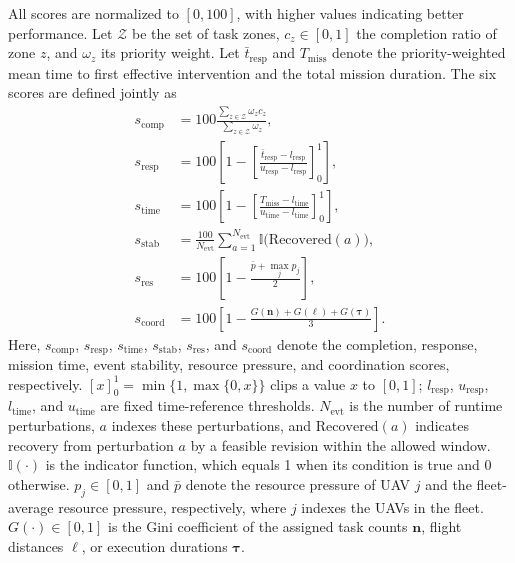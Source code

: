 All scores are normalized to $[0,100]$, with higher values indicating better
performance. Let $\mathcal{Z}$ be the set of task zones, $c_z\in[0,1]$ the completion
ratio of zone $z$, and $\omega_z$ its priority weight. Let
$\bar t_{\mathrm{resp}}$ and $T_{\mathrm{miss}}$ denote the priority-weighted mean time to
first effective intervention and the total mission duration. The six scores are
defined jointly as
\begin{equation}
\begin{aligned}
s_{\mathrm{comp}}
&=100\frac{\sum_{z\in \mathcal{Z}}\omega_zc_z}
 {\sum_{z\in \mathcal{Z}}\omega_z},\\
s_{\mathrm{resp}}
&=100\left[1-
\left[\frac{\bar t_{\mathrm{resp}}-l_{\mathrm{resp}}}
 {u_{\mathrm{resp}}-l_{\mathrm{resp}}}\right]_0^1\right],\\
s_{\mathrm{time}}
&=100\left[1-
\left[\frac{T_{\mathrm{miss}}-l_{\mathrm{time}}}
 {u_{\mathrm{time}}-l_{\mathrm{time}}}\right]_0^1\right],\\
s_{\mathrm{stab}}
&=\frac{100}{N_{\mathrm{evt}}}\sum_{a=1}^{N_{\mathrm{evt}}}
 \mathbb{I}\bigl(\mathrm{Recovered}(a)\bigr),\\
s_{\mathrm{res}}
 &=100\left[1-\frac{\bar p+\max_jp_j}{2}\right],\\
s_{\mathrm{coord}}
&=100\left[1-
\frac{G(\mathbf{n})+G(\boldsymbol{\ell})+G(\boldsymbol{\tau})}{3}\right].
\end{aligned}
\label{eq:mission-level-scores}
\end{equation}
Here, $s_{\mathrm{comp}}$, $s_{\mathrm{resp}}$, $s_{\mathrm{time}}$,
$s_{\mathrm{stab}}$, $s_{\mathrm{res}}$, and $s_{\mathrm{coord}}$ denote the
completion, response, mission time, event stability, resource pressure, and
coordination scores, respectively. $[x]_0^1=\min\{1,\max\{0,x\}\}$ clips a
value $x$ to $[0,1]$;
$l_{\mathrm{resp}}$, $u_{\mathrm{resp}}$, $l_{\mathrm{time}}$, and
$u_{\mathrm{time}}$ are fixed time-reference thresholds. $N_{\mathrm{evt}}$ is the number
of runtime perturbations, $a$ indexes these perturbations, and
$\mathrm{Recovered}(a)$ indicates recovery from perturbation $a$ by a feasible
revision within the allowed window. $\mathbb{I}(\cdot)$ is the
indicator function, which equals 1 when its condition is true and 0 otherwise.
$p_j\in[0,1]$ and $\bar p$ denote the resource pressure of UAV $j$ and the
fleet-average resource pressure, respectively, where $j$ indexes the UAVs in
the fleet. $G(\cdot)\in[0,1]$ is the Gini coefficient of the assigned task
counts $\mathbf{n}$, flight distances $\boldsymbol{\ell}$, or execution durations
$\boldsymbol{\tau}$.

